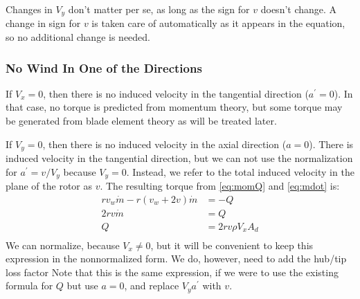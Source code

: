 \documentclass{article}
\begin{document}

Changes in $V_y$ don't matter per se, as long as the sign for $v$ doesn't change.  A change in sign for $v$ is taken care of automatically as it appears in the equation, so no additional change is needed.


\subsubsection{No Wind In One of the Directions}

If $V_x = 0$, then there is no induced velocity in the tangential direction ($a^\prime = 0$).  In that case, no torque is predicted from momentum theory, but some torque may be generated from blade element theory as will be treated later.

If $V_y = 0$, then there is no induced velocity in the axial direction ($a = 0$).  There is induced velocity in the tangential direction, but we can not use the normalization for $a^\prime = v/V_y$ because $V_y = 0$.  Instead, we refer to the total induced velocity in the plane of the rotor as $v$.  The resulting torque from \cref{eq:momQ} and \cref{eq:mdot} is:
\begin{equation}
    \begin{aligned}
        r v_w \dot{m} - r (v_w + 2 v) \dot{m} &= -Q\\
        2 r v \dot{m} &= Q\\
        Q &= 2 r v \rho V_x A_d\\
    \end{aligned}
\end{equation}
We can normalize, because $V_x \ne 0$, but it will be convenient to keep this expression in the nonnormalized form.  We do, however, need to add the hub/tip loss factor
Note that this is the same expression, if we were to use the existing formula for $Q$ but use $a = 0$, and replace $V_y a^\prime$ with $v$.
\end{document}

